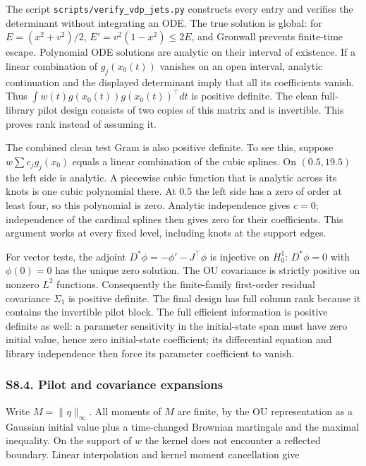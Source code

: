 \documentclass[
  american,
  11pt,
]{article}
\begin{document}
The script \texttt{scripts/verify\_vdp\_jets.py} constructs every entry
and verifies the determinant without integrating an ODE. The true
solution is global: for \(E=(x^2+v^2)/2\), \(E'=v^2(1-x^2)\leq2E\), and
Gronwall prevents finite-time escape. Polynomial ODE solutions are
analytic on their interval of existence. If a linear combination of
\(g_j(x_0(t))\) vanishes on an open interval, analytic continuation and
the displayed determinant imply that all its coefficients vanish. Thus
\(\int w(t)g(x_0(t))g(x_0(t))^\top dt\) is positive definite. The clean
full-library pilot design consists of two copies of this matrix and is
invertible. This proves rank instead of assuming it.

The combined clean test Gram is also positive definite. To see this,
suppose \(w\sum c_jg_j(x_0)\) equals a linear combination of the cubic
splines. On \((0.5,19.5)\) the left side is analytic. A piecewise cubic
function that is analytic across its knots is one cubic polynomial
there. At \(0.5\) the left side has a zero of order at least four, so
this polynomial is zero. Analytic independence gives \(c=0\);
independence of the cardinal splines then gives zero for their
coefficients. This argument works at every fixed level, including knots
at the support edges.

For vector tests, the adjoint \(D^*\phi=-\phi'-J^\top\phi\) is injective
on \(H_0^1\): \(D^*\phi=0\) with \(\phi(0)=0\) has the unique zero
solution. The OU covariance is strictly positive on nonzero \(L^2\)
functions. Consequently the finite-family first-order residual
covariance \(\Sigma_1\) is positive definite. The final design has full
column rank because it contains the invertible pilot block. The full
efficient information is positive definite as well: a parameter
sensitivity in the initial-state span must have zero initial value,
hence zero initial-state coefficient; its differential equation and
library independence then force its parameter coefficient to vanish.

\subsubsection{S8.4. Pilot and covariance
expansions}\label{s8.4.-pilot-and-covariance-expansions}

Write \(M=\|\eta\|_\infty\). All moments of \(M\) are finite, by the OU
representation as a Gaussian initial value plus a time-changed Brownian
martingale and the maximal inequality. On the support of \(w\) the
kernel does not encounter a reflected boundary. Linear interpolation and
kernel moment cancellation give
\end{document}
